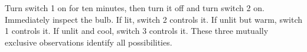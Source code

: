 Turn switch 1 on for ten minutes, then turn it off and turn switch 2 on. Immediately inspect the bulb. If lit, switch 2 controls it. If unlit but warm, switch 1 controls it. If unlit and cool, switch 3 controls it. These three mutually exclusive observations identify all possibilities.
